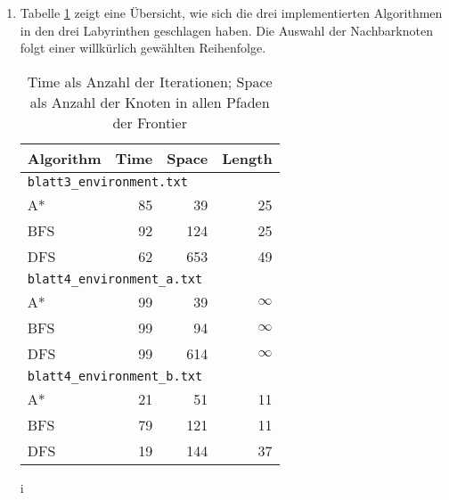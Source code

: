 \documentclass[a4paper]{scrartcl}
\begin{document}
\begin{enumerate}
    \item
        Tabelle \ref{tab:time-space} zeigt eine Übersicht, wie sich die drei
        implementierten Algorithmen in den drei Labyrinthen geschlagen haben.
        Die Auswahl der Nachbarknoten folgt einer willkürlich gewählten
        Reihenfolge.
        \begin{table}[H]
            \centering
            \begin{tabular}{|l|r|r|r|}
                \hline
                Algorithm & Time & Space & Length \\ \hline
                \multicolumn{4}{|l|}{\texttt{blatt3\_environment.txt}} \\ \hline
                A*  &  85 &  39 & 25 \\ \hline
                BFS &  92 & 124 & 25 \\ \hline
                DFS &  62 & 653 & 49 \\ \hline
                \multicolumn{4}{|l|}{\texttt{blatt4\_environment\_a.txt}} \\ \hline
                A*  &  99 &  39 & $\infty$ \\ \hline
                BFS &  99 &  94 & $\infty$ \\ \hline
                DFS &  99 & 614 & $\infty$ \\ \hline
                \multicolumn{4}{|l|}{\texttt{blatt4\_environment\_b.txt}} \\ \hline
                A*  &  21 &  51 & 11 \\ \hline
                BFS &  79 & 121 & 11 \\ \hline
                DFS &  19 & 144 & 37 \\ \hline
            \end{tabular}
            \caption{Time als Anzahl der Iterationen; Space als Anzahl der
            Knoten in allen Pfaden der Frontier}
            \label{tab:time-space}
        \end{table}
i
\end{enumerate}
\end{document}
